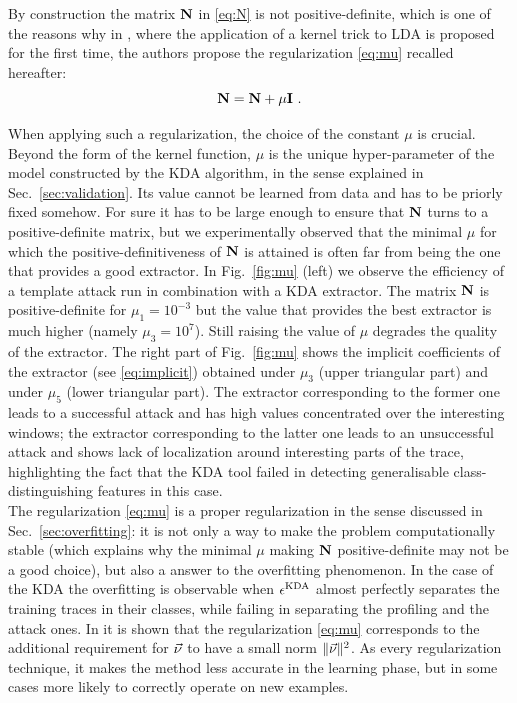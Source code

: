 By construction the matrix $\textbf{N}$ in \eqref{eq:N} is not positive-definite, which is one of the reasons why in \cite{scholkopf1999fisher}, where the application of a kernel trick to LDA is proposed for the first time, the authors propose the regularization \eqref{eq:mu} recalled hereafter:
\begin{equation}
\textbf{N} = \textbf{N} + \mu\textbf{I} \mbox{ .}
\end{equation}

When applying such a regularization, the choice of the constant $\mu$ is crucial. Beyond the form of the kernel function, $\mu$ is the unique hyper-parameter of the model constructed by the KDA algorithm, in the sense explained in Sec.~\ref{sec:validation}. Its value cannot be learned from data and has to be priorly fixed somehow. For sure it has to be large enough to ensure that $\textbf{N}$ turns to a positive-definite matrix, but we experimentally observed  that the minimal $\mu$ for which the positive-definitiveness of $\textbf{N}$ is attained is often far from  being the one that provides a good extractor. In Fig.~\ref{fig:mu} (left) we observe the efficiency of a template attack run in combination with a KDA extractor. The matrix $\textbf{N}$ is positive-definite for $\mu_1 = 10^{-3}$ but the value that provides the best extractor is much higher (namely $\mu_3 = 10^{7}$). Still raising the value of $\mu$ degrades the quality of the extractor. The right part of Fig.~\ref{fig:mu} shows the implicit coefficients of the extractor (see \eqref{eq:implicit}) obtained under $\mu_3$ (upper triangular part) and under $\mu_5$ (lower triangular part). The extractor corresponding to the former one leads to a successful attack and has high values concentrated over the interesting windows; the extractor corresponding to the latter one leads to an unsuccessful attack and shows lack of localization around interesting parts of the trace, highlighting the fact that the KDA tool failed in detecting generalisable class-distinguishing features in this case.\\

The regularization \eqref{eq:mu} is a proper regularization in the sense discussed in Sec.~\ref{sec:overfitting}: it is not only a way to make the problem computationally stable (which explains why the minimal $\mu$ making $\textbf{N}$ positive-definite may not be a good choice), but also a answer to the overfitting phenomenon. In the case of the KDA the overfitting is observable when $\epsilon^{\mathrm{KDA}}$ almost perfectly separates the training traces in their classes, while failing in separating the profiling and the attack ones. In \cite{scholkopf1999fisher} it is shown that the regularization \eqref{eq:mu} corresponds to the additional requirement for $\vec{\nu}$ to have a small norm $\lVert\vec{\nu}\rVert^2$. As every regularization technique, it makes the method less accurate in the learning phase, but in some cases more likely to correctly operate on new examples.

